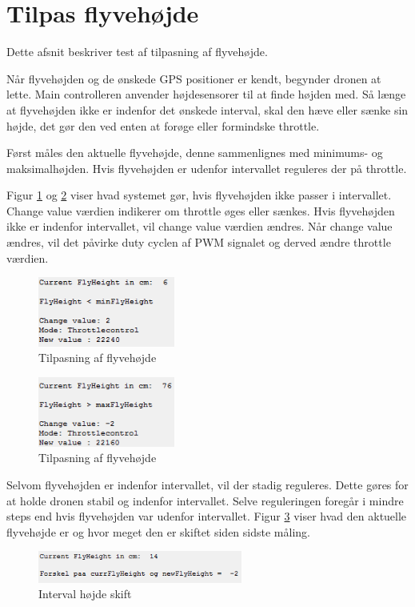 \section{Tilpas flyvehøjde}

Dette afsnit beskriver test af tilpasning af flyvehøjde.

Når flyvehøjden og de ønskede GPS positioner er kendt, begynder dronen at lette. Main controlleren anvender højdesensorer til at finde højden med. Så længe at flyvehøjden ikke er indenfor det ønskede interval, skal den hæve eller sænke sin højde, det gør den ved enten at forøge eller formindske throttle. 

Først måles den aktuelle flyvehøjde, denne sammenlignes med minimums- og maksimalhøjden. Hvis flyvehøjden er udenfor intervallet reguleres der på throttle. 

Figur \ref{fig:skift_hoejde} og \ref{fig:skift_hoejde2} viser hvad systemet gør, hvis flyvehøjden ikke passer i intervallet. 
Change value værdien indikerer om throttle øges eller sænkes. Hvis flyvehøjden ikke er indenfor intervallet, vil change value værdien ændres. 
Når change value ændres, vil det påvirke duty cyclen af PWM signalet og derved ændre throttle værdien.

\begin{figure}[H]
\centering
\includegraphics[width=0.4\textwidth]{Billeder/Test/skift_hoejde.png}
\caption{Tilpasning af flyvehøjde}
\label{fig:skift_hoejde}
\end{figure}

\begin{figure}[H]
\centering
\includegraphics[width=0.4\textwidth]{Billeder/Test/skift_hoejde2.png}
\caption{Tilpasning af flyvehøjde}
\label{fig:skift_hoejde2}
\end{figure}

Selvom flyvehøjden er indenfor intervallet, vil der stadig reguleres. Dette gøres for at holde dronen stabil og indenfor intervallet. Selve reguleringen foregår i mindre steps end hvis flyvehøjden var udenfor intervallet.
Figur \ref{fig:interval_skift} viser hvad den aktuelle flyvehøjde er og hvor meget den er skiftet siden sidste måling.

\begin{figure}[H]
\centering
\includegraphics[width=0.6\textwidth]{Billeder/Test/hoejdei_interval_skift.png}
\caption{Interval højde skift}
\label{fig:interval_skift}
\end{figure}